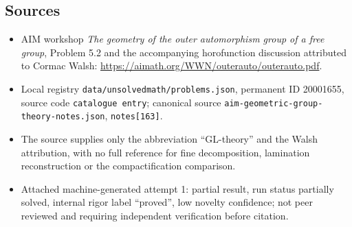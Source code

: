 \documentclass[11pt]{article}
\begin{document}
\subsection{Sources}
\begin{itemize}
\item AIM workshop \emph{The geometry of the outer automorphism group of a free group}, Problem 5.2 and the accompanying horofunction discussion attributed to Cormac Walsh: \url{https://aimath.org/WWN/outerauto/outerauto.pdf}.
\item Local registry \texttt{data/unsolvedmath/problems.json}, permanent ID 20001655, source code \texttt{catalogue entry}; canonical source \texttt{aim-geometric-group-theory-notes.json}, \texttt{notes[163]}.
\item The source supplies only the abbreviation ``GL-theory'' and the Walsh attribution, with no full reference for fine decomposition, lamination reconstruction or the compactification comparison.
\item Attached machine-generated attempt 1: partial result, run status partially solved, internal rigor label ``proved'', low novelty confidence; not peer reviewed and requiring independent verification before citation.
\end{itemize}
\end{document}
